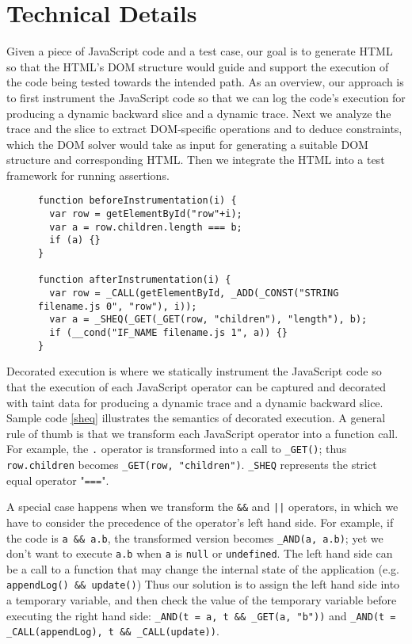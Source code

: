 \section{Technical Details}
Given a piece of JavaScript code and a test case, our goal is to generate HTML so that the HTML's DOM structure would guide and support the execution of the code being tested towards the intended path.  
As an overview, our approach is to first instrument the JavaScript code so that we can log the code's execution for producing a dynamic backward slice and a dynamic trace.  
Next we analyze the trace and the slice to extract DOM-specific operations and to deduce constraints, which the DOM solver would take as input for generating a suitable DOM structure and corresponding HTML.  
Then we integrate the HTML into a test framework for running assertions.  


\begin{figure}
\begin{lstlisting}[caption=Example showing how code is instrumented for dynamic analysis.,label=sheq]  
function beforeInstrumentation(i) {
  var row = getElementById("row"+i);
  var a = row.children.length === b; 
  if (a) {}
}

function afterInstrumentation(i) {
  var row = _CALL(getElementById, _ADD(_CONST("STRING filename.js 0", "row"), i));
  var a = _SHEQ(_GET(_GET(row, "children"), "length"), b);
  if (__cond("IF_NAME filename.js 1", a)) {}
}
\end{lstlisting}
\end{figure}


Decorated execution is where we statically instrument the JavaScript code so that the execution of each JavaScript operator can be captured and decorated with taint data for producing a dynamic trace and a dynamic backward slice.  Sample code \ref{sheq} illustrates the semantics of decorated execution.  
A general rule of thumb is that we transform each JavaScript operator into a function call.  For example, the {\tt .} operator is transformed into a call to {\tt \_GET()}; thus {\tt row.children} becomes {\tt \_GET(row, "children")}.  {\tt \_SHEQ} represents the strict equal operator "{\tt ===}".  

A special case happens when we transform the {\tt \&\&} and {\tt |}{\tt |} operators, in which we have to consider the precedence of the operator's left hand side.   
For example, if the code is {\tt a \&\& a.b}, the transformed version becomes {\tt \_AND(a, a.b)}; yet we don't want to execute {\tt a.b} when {\tt a} is {\tt null} or {\tt undefined}.  
The left hand side can be a call to a function that may change the internal state of the application (e.g. {\tt appendLog() \&\& update()})
Thus our solution is to assign the left hand side into a temporary variable, and then check the value of the temporary variable before executing the right hand side: {\tt \_AND(t = a, t \&\& \_GET(a, "b"))} and {\tt \_AND(t = \_CALL(appendLog), t \&\& \_CALL(update))}.  

